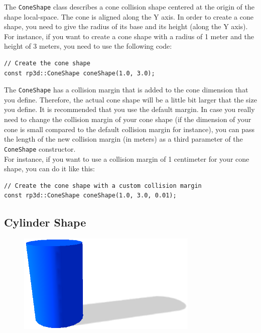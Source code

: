 \documentclass[a4paper,12pt]{article}
\begin{document}
    The \texttt{ConeShape} class describes a cone collision shape centered at the origin of the shape local-space. The cone is aligned along the Y axis.
    In order to create a cone shape, you need to give the radius of its base and its height (along the Y axis). \\

    For instance, if you want to create a cone shape with a radius of 1 meter and the height of 3 meters, you need to use the following code: \\

    \begin{lstlisting}
// Create the cone shape
const rp3d::ConeShape coneShape(1.0, 3.0);
  \end{lstlisting}

    \vspace{0.6cm}

    The \texttt{ConeShape} has a collision margin that is added to the cone dimension that you define. Therefore, the actual cone shape will be a little bit larger that the size you define.
    It is recommended that you use the default margin. In case you really need to change the collision margin of your cone shape (if the dimension of your cone is small compared
    to the default collision margin for instance), you can pass the length of the new collision margin (in meters) as a third parameter of the \texttt{ConeShape} constructor. \\

    For instance, if you want to use a collision margin of 1 centimeter for your cone shape, you can do it like this: \\

   \begin{lstlisting}
// Create the cone shape with a custom collision margin
const rp3d::ConeShape coneShape(1.0, 3.0, 0.01);
  \end{lstlisting}

    \subsection{Cylinder Shape}

    \begin{figure}[h]
        \centering
        \includegraphics{cylindershape.png}
        \label{fig:cylindershape}
    \end{figure}
\end{document}
